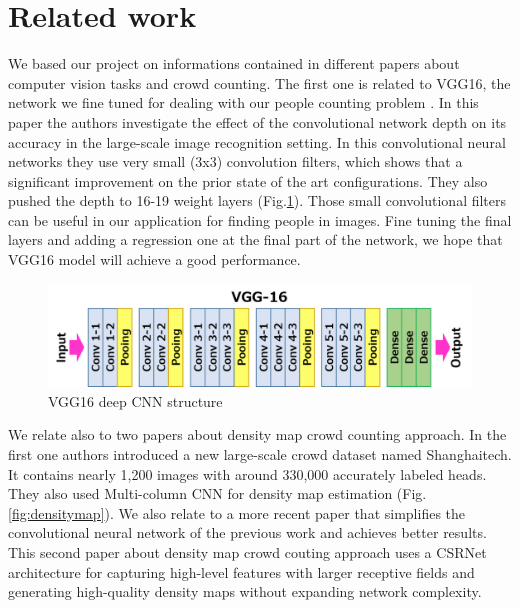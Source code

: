\documentclass[10pt,twocolumn,letterpaper]{article}
\begin{document}
\section{Related work}

We based our project on informations contained in different papers about computer vision tasks and crowd counting. The first one is related to VGG16, the network we fine tuned for dealing with our people counting problem \cite{simonyan2014very}. In this paper the authors investigate the effect of the convolutional network depth on its accuracy in the
large-scale image recognition setting. In this convolutional neural networks they use very small (3x3) convolution filters, which shows that a significant improvement on the prior state of the art configurations. They also pushed the depth to 16-19 weight layers (Fig.\ref{fig:vgg16}). Those small convolutional filters can be useful in our application for finding people in images. Fine tuning the final layers and adding a regression one at the final part of the network, we hope that VGG16 model will achieve a good performance. 

\begin{figure}[h!]
  \includegraphics[width=\linewidth]{pics/vgg16.png}
  \caption{VGG16 deep CNN structure}
  \label{fig:vgg16}
\end{figure}

We relate also to two papers about density map crowd counting approach. In the first one \cite{zhang2016single} authors introduced a new large-scale crowd dataset named Shanghaitech. It contains nearly 1,200 images with around 330,000 accurately labeled heads. They also used Multi-column CNN for density map estimation (Fig.\ref{fig:densitymap}). We also relate to a more recent paper that simplifies the convolutional neural network of the previous work and achieves better results. This second paper about density map crowd couting approach \cite{li2018csrnet} uses a CSRNet architecture for capturing high-level features with
larger receptive fields and generating high-quality density maps without expanding network complexity. 
\end{document}
